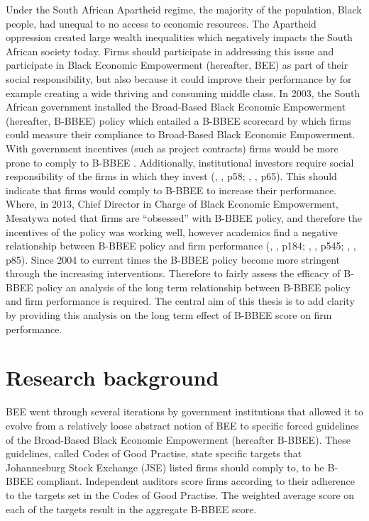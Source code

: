 Under the South African Apartheid regime, the majority of the population, Black people,  had unequal to no access to economic resources. The Apartheid oppression created large wealth inequalities which negatively impacts the South African society today. Firms should participate in addressing this issue and participate in Black Economic Empowerment (hereafter, BEE) as part of their social responsibility, but also because it could improve their performance by for example creating a wide thriving and consuming middle class. In 2003, the South African government installed the Broad-Based Black Economic Empowerment (hereafter, B-BBEE) policy which entailed a B-BBEE scorecard by which firms could measure their compliance to Broad-Based Black Economic Empowerment. With government incentives (such as project contracts) firms would be more prone to comply to B-BBEE \cite[p546]{N7}. Additionally, institutional investors require social responsibility of the firms in which they invest
(\citeauthor{N39}, \citeyear{N39}, p58; \citeauthor{N39}, \citeyear{N39}, p65). This should indicate that firms would comply to B-BBEE to increase their performance. Where, in 2013, Chief Director in Charge of Black Economic Empowerment, Mesatywa noted that firms are “obsessed” with B-BBEE policy, and therefore the incentives of the policy was working well, however academics find a negative relationship between B-BBEE policy and firm performance (\citeauthor{N31}, \citeyear{N31}, p184; \citeauthor{N7}, \citeyear{N7}, p545;  \citeauthor{N27}, \citeyear{N27}, p85). Since 2004 to current times the B-BBEE policy become more stringent through the increasing interventions. Therefore to fairly assess the efficacy of B-BBEE policy an analysis of the long term relationship between B-BBEE policy and firm performance is required.  The central aim of this thesis is to add clarity by providing this analysis on the long term effect of B-BBEE score on firm performance. 
\section{Research background}
BEE went through several iterations by government institutions that allowed it to evolve from a relatively loose abstract notion of BEE to specific forced guidelines of the Broad-Based Black Economic Empowerment (hereafter B-BBEE). These guidelines, called Codes of Good Practise, state specific targets that Johannesburg Stock Exchange (JSE) listed firms should comply to, to be B-BBEE compliant. Independent auditors score firms according to their adherence to the targets set in the Codes of Good Practise. The weighted average score on each of the targets result in the aggregate B-BBEE score.


